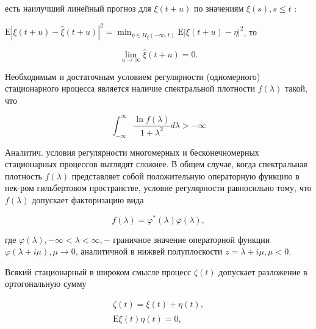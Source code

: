 \documentclass[10pt]{article}
\begin{document}
есть наилучший линейный прогноз для $\xi(t+u)$ по значениям $\xi(s), s \leqslant t$ :



$\mathrm{E}|\xi(t+u)-\hat{\xi}(t+u)|^{2}=\min _{\eta \in H_{\xi}(-\infty, t)} \mathrm{E}|\xi(t+u)-\eta|^{2}$, то



\[

\lim _{u \rightarrow \infty} \hat{\xi}(t+u)=0 .

\]



Необходимым и достаточным условием регулярности (одномерного) стационарного нроцесса является наличие спектральной плотности $f(\lambda)$ такой, что



\[

\int_{-\infty}^{\infty} \frac{\ln f(\lambda)}{1+\lambda^{2}} d \lambda>-\infty

\]



Аналитич. условия регулярности многомерных и бесконечномерных стационарных процессов выглядят сложнее. В общем случае, когда спектральная плотность $f(\lambda)$ представляет собой положительную операторную функцию в нек-ром гильбертовом пространстве, условие регулярности равносильно тому, что $f(\lambda)$ допускает факторизацию вида



\[

f(\lambda)=\varphi^{*}(\lambda) \varphi(\lambda),

\]



где $\varphi(\lambda),-\infty<\lambda<\infty,-$ граничное значение операторной функции $\varphi(\lambda+i \mu), \mu \rightarrow 0$, аналитичной в нижвей полуплоскости $z=\lambda+i \mu, \mu<0$.



Всякий стационарный в широком смысле процесс $\zeta(t)$ допускает разложение в ортогональную сумму



\[

\begin{gathered}

\zeta(t)=\xi(t)+\eta(t), \\

\mathrm{E} \xi(t) \overline{\eta(t)}=0,

\end{gathered}

\]
\end{document}

